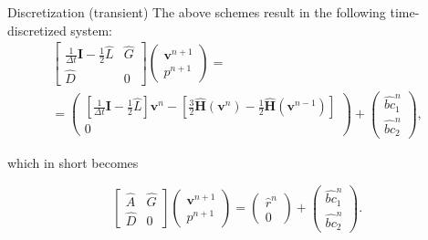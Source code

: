 \documentclass{beamer}
\begin{document}
	\begin{frame}{Discretization (transient)}
	The above schemes result in the following time-discretized system:
	\begin{multline}
		\begin{bmatrix}
			\frac{1}{\Delta t}\mathbf{I}-\frac{1}{2}\hat{L} & \hat{G} \\
			\hat{D} & 0
		\end{bmatrix}
		\begin{pmatrix}
			\boldsymbol{v}^{n+1} \\ 
			p^{n+1}
		\end{pmatrix}=\\
		=
		\begin{pmatrix}
			\left[\frac{1}{\Delta t}\mathbf{I}-\frac{1}{2}\hat{L}\right] \boldsymbol{v}^n - \left[\frac{3}{2}\hat{\mathbf{H}}(\boldsymbol{v}^n) - \frac{1}{2}\hat{\mathbf{H}}(\boldsymbol{v}^{n-1})\right]\\
			0
		\end{pmatrix}
		+
		\begin{pmatrix}
			\hat{bc}_1^n\\
			\hat{bc}_2^n
		\end{pmatrix},
	\end{multline}	
	
	which in short becomes
	
	\begin{equation}\label{eqn:NSE-dsm-bl-system-nonint}
	\boxed{\begin{bmatrix}
		\hat{A} & \hat{G} \\
		\hat{D} & 0
	\end{bmatrix}
	\begin{pmatrix}
		\boldsymbol{v}^{n+1} \\ 
		p^{n+1}
	\end{pmatrix}
	=
	\begin{pmatrix}
		\hat{r}^n \\
		0
	\end{pmatrix}
	+
	\begin{pmatrix}
		\hat{bc}_1^n\\
		\hat{bc}_2^n
	\end{pmatrix}}.
	\end{equation}
	\end{frame}

	
	
	
	
\end{document}
